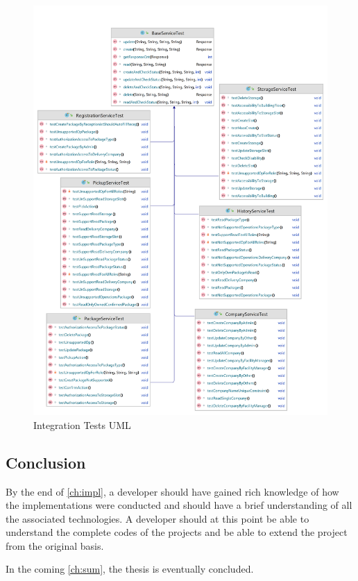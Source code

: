 \begin{figure}[H]
    \centering
    \includegraphics[width=1\linewidth]{images/test/api_test_white.png}
    \caption{Integration Tests UML}
    \label{fig:it_uml}
\end{figure}


\subsection*{Conclusion}

By the end of \autoref{ch:impl}, a developer should have gained rich knowledge of how the implementations were conducted and should have a brief understanding of all the associated technologies. A developer should at this point be able to understand the complete codes of the projects and be able to extend the project from the original basis. 

In the coming \autoref{ch:sum}, the thesis is eventually concluded.